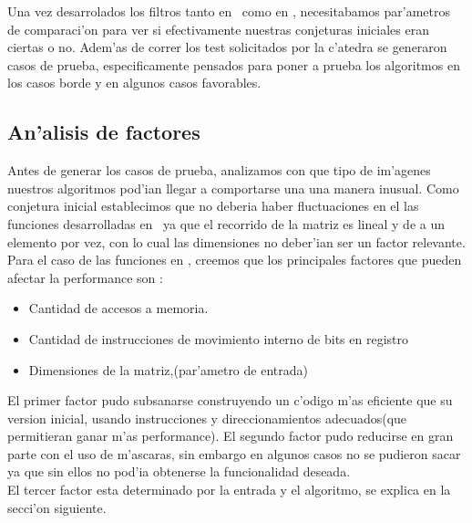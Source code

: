 Una vez desarrolados los filtros tanto en \C \  como en \ass, necesitabamos par'ametros de comparaci'on
para ver si efectivamente nuestras conjeturas iniciales eran ciertas o no.
Adem'as de correr los test solicitados por la c'atedra se generaron casos de prueba,
especificamente pensados para poner a prueba los algoritmos en los casos borde y en algunos casos
favorables.\\
\subsection{An'alisis de factores}
Antes de generar los casos de prueba, analizamos con que tipo de im'agenes nuestros algoritmos pod'ian
llegar a comportarse una una manera inusual. Como conjetura inicial establecimos que no deberia haber 
fluctuaciones en el las funciones desarrolladas en \C \ ya que el recorrido de la matriz es lineal y
de a un elemento por vez, con lo cual las dimensiones no deber'ian ser un factor relevante. \\
Para el caso de las funciones en \ass, creemos que los principales factores que pueden afectar la 
performance son : \\
\begin{itemize}
 \item{Cantidad de accesos a memoria}.
 \item{Cantidad de instrucciones de movimiento interno de bits en registro}
 \item{Dimensiones de la matriz,(par'ametro de entrada)}
\end{itemize}
El primer factor pudo subsanarse construyendo un c'odigo m'as eficiente que su version inicial, 
usando instrucciones y direccionamientos adecuados(que permitieran ganar m'as performance).
El segundo factor pudo reducirse en gran parte con el uso de m'ascaras, sin embargo en algunos casos
no se pudieron sacar ya que sin ellos no pod'ia obtenerse la funcionalidad deseada.\\
El tercer factor esta determinado por la entrada y el algoritmo, se explica en la secci'on siguiente.
